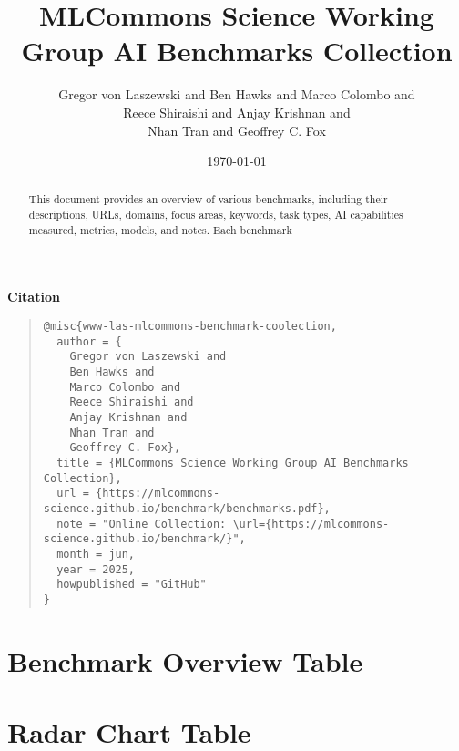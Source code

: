 \documentclass[10pt]{article}
\begin{document}
\sloppy
\author{
    Gregor von Laszewski and 
    Ben Hawks and 
    Marco Colombo and
    \\ Reece Shiraishi and
    Anjay Krishnan and
    \\ Nhan Tran and
    Geoffrey C. Fox}

\date{\today}
\title{MLCommons Science Working Group AI Benchmarks Collection}
\maketitle

\begin {abstract}
This document provides an overview of various benchmarks, including their descriptions, URLs, domains, focus areas, keywords, task types, AI capabilities measured, metrics, models, and notes. Each benchmark
\end{abstract}

\vfill 

{\centering \bfseries Citation \par}

\begin{quote}
\begin{verbatim}
@misc{www-las-mlcommons-benchmark-coolection,
  author = {
    Gregor von Laszewski and 
    Ben Hawks and 
    Marco Colombo and
    Reece Shiraishi and
    Anjay Krishnan and
    Nhan Tran and
    Geoffrey C. Fox},
  title = {MLCommons Science Working Group AI Benchmarks Collection},
  url = {https://mlcommons-science.github.io/benchmark/benchmarks.pdf},
  note = "Online Collection: \url={https://mlcommons-science.github.io/benchmark/}",
  month = jun,
  year = 2025,
  howpublished = "GitHub"
} 
\end{verbatim}
\end{quote}
\clearpage
\tableofcontents
\clearpage


\section{Benchmark Overview Table}



\clearpage


\section{Radar Chart Table}



\clearpage
\end{document}
